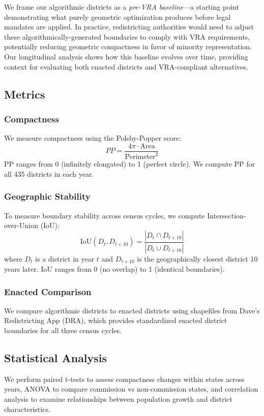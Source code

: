 We frame our algorithmic districts as a \textit{pre-VRA baseline}—a starting point demonstrating what purely geometric optimization produces before legal mandates are applied. In practice, redistricting authorities would need to adjust these algorithmically-generated boundaries to comply with VRA requirements, potentially reducing geometric compactness in favor of minority representation. Our longitudinal analysis shows how this baseline evolves over time, providing context for evaluating both enacted districts and VRA-compliant alternatives.

\subsection{Metrics}

\subsubsection{Compactness}

We measure compactness using the Polsby-Popper score:
\[
PP = \frac{4\pi \cdot \text{Area}}{\text{Perimeter}^2}
\]
PP ranges from 0 (infinitely elongated) to 1 (perfect circle). We compute PP for all 435 districts in each year.

\subsubsection{Geographic Stability}

To measure boundary stability across census cycles, we compute Intersection-over-Union (IoU):
\[
\text{IoU}(D_t, D_{t+10}) = \frac{|D_t \cap D_{t+10}|}{|D_t \cup D_{t+10}|}
\]
where $D_t$ is a district in year $t$ and $D_{t+10}$ is the geographically closest district 10 years later. IoU ranges from 0 (no overlap) to 1 (identical boundaries).

\subsubsection{Enacted Comparison}

We compare algorithmic districts to enacted districts using shapefiles from Dave's Redistricting App (DRA), which provides standardized enacted district boundaries for all three census cycles.

\subsection{Statistical Analysis}

We perform paired t-tests to assess compactness changes within states across years, ANOVA to compare commission vs non-commission states, and correlation analysis to examine relationships between population growth and district characteristics.
